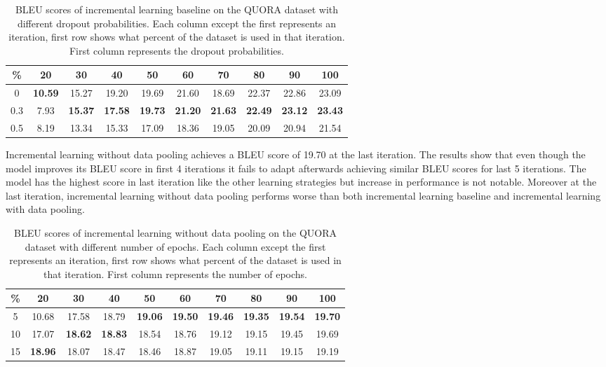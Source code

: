 \begin{table}[t]
\centering
\small
 \begin{tabular}{|c | c | c | c | c | c | c | c | c | c |} 
 \hline
 \% & 20 & 30 & 40 & 50 & 60 & 70 & 80 & 90 & 100 \\ [0.5ex] 
 \hline
  0 & \textbf{10.59} & 15.27 & 19.20 & 19.69 & 21.60 & 18.69 & 22.37 & 22.86 & 23.09  \\ 
 \hline
  0.3 & 7.93 & \textbf{15.37} & \textbf{17.58} & \textbf{19.73} & \textbf{21.20} & \textbf{21.63} & \textbf{22.49} & \textbf{23.12} & \textbf{23.43} \\ 
 \hline
  0.5 & 8.19 & 13.34 & 15.33 & 17.09 & 18.36 & 19.05 & 20.09 & 20.94 & 21.54 \\ 
 \hline
\end{tabular}
\caption{BLEU scores of incremental learning baseline on the QUORA dataset with different dropout probabilities. Each column except the first represents an iteration, first row shows what percent of the dataset is used in that iteration. First column represents the dropout probabilities.}
\end{table}

Incremental learning without data pooling achieves a BLEU score of 19.70 at the last iteration. The results show that even though the model improves its BLEU score in first 4 iterations it fails to adapt afterwards achieving similar BLEU scores for last 5 iterations. The model has the highest score in last iteration like the other learning strategies but increase in performance is not notable. Moreover at the last iteration, incremental learning without data pooling performs worse than both incremental learning baseline and incremental learning with data pooling.

\begin{table}[b]
\centering
\small
 \begin{tabular}{|c | c | c | c | c | c | c | c | c | c |} 
 \hline
 \% & 20 & 30 & 40 & 50 & 60 & 70 & 80 & 90 & 100 \\ [0.5ex] 
 \hline
  5 & 10.68 & 17.58 & 18.79 & \textbf{19.06} & \textbf{19.50} & \textbf{19.46} & \textbf{19.35} & \textbf{19.54} & \textbf{19.70}  \\ 
 \hline
  10 & 17.07 & \textbf{18.62} & \textbf{18.83} & 18.54 & 18.76 & 19.12 & 19.15 & 19.45 & 19.69 \\ 
 \hline
 15 & \textbf{18.96} & 18.07 & 18.47 & 18.46 & 18.87 & 19.05 & 19.11 & 19.15 & 19.19 \\ 
 \hline
\end{tabular}
\caption{BLEU scores of incremental learning without data pooling on the QUORA dataset with different number of epochs. Each column except the first represents an iteration, first row shows what percent of the dataset is used in that iteration. First column represents the number of epochs.}
\end{table}

